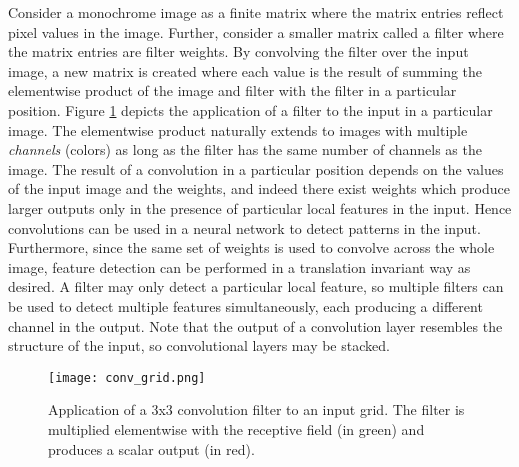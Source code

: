 Consider a monochrome image as a finite matrix where the matrix entries reflect pixel values in the image. 
Further, consider a smaller matrix called a filter where the matrix entries are filter weights.
By convolving the filter over the input image, a new matrix is created where each value is the result of summing the elementwise product of the image and filter with the filter in a particular position.
Figure \ref{fig:convolutionallayer} depicts the application of a filter to the input in a particular image.
The elementwise product naturally extends to images with multiple \textit{channels} (colors) as long as the filter has the same number of channels as the image.
The result of a convolution in a particular position depends on the values of the input image and the weights, and indeed there exist weights which produce larger outputs only in the presence of particular local features in the input.
Hence convolutions can be used in a neural network to detect patterns in the input.
Furthermore, since the same set of weights is used to convolve across the whole image, feature detection can be performed in a translation invariant way as desired. 
A filter may only detect a particular local feature, so multiple filters can be used to detect multiple features simultaneously, each producing a different channel in the output.
Note that the output of a convolution layer resembles the structure of the input, so convolutional layers may be stacked.


\begin{figure}
	\centering
	\texttt{[image: conv\_grid.png]}
	\caption{Application of a 3x3 convolution filter to an input grid. The filter is multiplied elementwise with the receptive field (in green) and produces a scalar output (in red).}
	\label{fig:convolutionallayer}
\end{figure}

